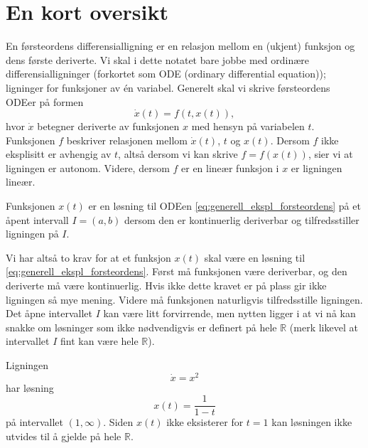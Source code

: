 \documentclass{article}
\theoremstyle{plain}
\theoremstyle{definition}
\theoremstyle{remark}
\newenvironment{defn}
{\pushQED{\qed}\renewcommand{\qedsymbol}{$\triangle$}\defnx}
{\popQED\enddefnx}
\newenvironment{ex}
{\pushQED{\qed}\renewcommand{\qedsymbol}{$\triangle$}\exx}
{\popQED\endexx}
\newcommand{\fcn}{x}
\begin{document}
\section*{En kort oversikt}

En førsteordens differensialligning er en relasjon mellom en (ukjent) funksjon og dens første deriverte. Vi skal i dette notatet bare jobbe med ordinære differensialligninger (forkortet som ODE (ordinary differential equation)); ligninger for funksjoner av én variabel. Generelt skal vi skrive førsteordens ODEer på formen
\begin{equation} \label{eq:generell_ekspl_forsteordens}
    \dot{\fcn}(t) = f(t, \fcn(t)),
\end{equation}
hvor $\dot{\fcn}$ betegner deriverte av funksjonen $\fcn$ med hensyn på variabelen $t$. Funksjonen $f$ beskriver relasjonen mellom $\dot{\fcn}(t)$, $t$ og $\fcn(t)$. Dersom $f$ ikke eksplisitt er avhengig av $t$, altså dersom vi kan skrive $f = f(\fcn(t))$, sier vi at ligningen er autonom. Videre, dersom $f$ er en lineær funksjon i $\fcn$ er ligningen lineær.

\begin{defn}
    Funksjonen $\fcn(t)$ er en løsning til ODEen \eqref{eq:generell_ekspl_forsteordens} på et åpent intervall $I = (a, b)$ dersom den er kontinuerlig deriverbar og tilfredsstiller ligningen på $I$.
\end{defn}

Vi har altså to krav for at et funksjon $x(t)$ skal være en løsning til \eqref{eq:generell_ekspl_forsteordens}. Først må funksjonen være deriverbar, og den deriverte må være kontinuerlig. Hvis ikke dette kravet er på plass gir ikke ligningen så mye mening. Videre må funksjonen naturligvis tilfredsstille ligningen. Det åpne intervallet $I$ kan være litt forvirrende, men nytten ligger i at vi nå kan snakke om løsninger som ikke nødvendigvis er definert på hele $\mathbb{R}$ (merk likevel at intervallet $I$ fint kan være hele $\mathbb{R}$).

\begin{ex}
    Ligningen
    \begin{equation*}
        \dot{x} = x^2
    \end{equation*}
    har løsning
    \begin{equation*}
        x(t) = \frac{1}{1-t}
    \end{equation*}
    på intervallet $(1, \infty)$. Siden $x(t)$ ikke eksisterer for $t=1$ kan løsningen ikke utvides til å gjelde på hele $\mathbb{R}$.
\end{ex}
\end{document}
